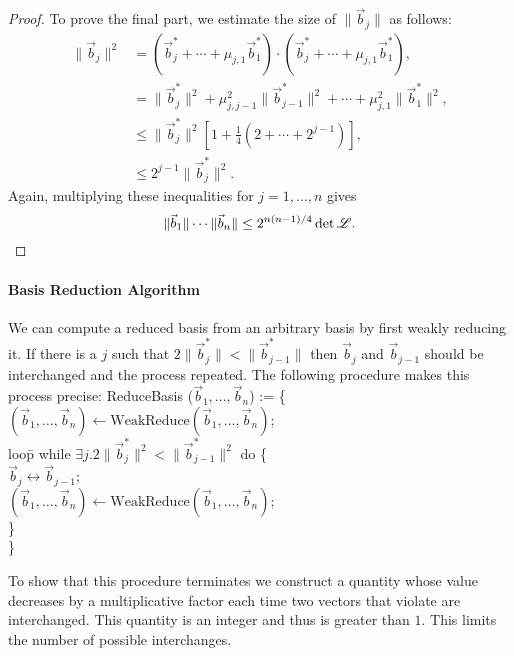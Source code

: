 \begin{proof}
To prove the final part, we estimate the size of $\|\vec{b}_j\|$ as follows:
\[
\begin{aligned}
 \|\vec{b}_j\|^2 
   & = (\vec{b}^{\ast}_j + \cdots + \mu_{j,1} \vec{b}^{\ast}_{1})
     \cdot
       (\vec{b}^{\ast}_j + \cdots + \mu_{j,1} \vec{b}^{\ast}_{1}), \\
   & = \|\vec{b}^{\ast}_j\|^2 + \mu_{j,j-1}^2 \|\vec{b}^{\ast}_{j-1}\|^2 +
       \cdots + \mu_{j,1}^2 \|\vec{b}^{\ast}_{1}\|^2, \\[3pt]
   & \displaystyle
     \le \|\vec{b}^{\ast}_j\|^2 \left[ 1 + \frac{1}{4}(2 + \cdots +
2^{j-1})\right], \\
 & \le 2^{j-1} \|\vec{b}^{\ast}_j\|^2.
\end{aligned}
\]
Again, multiplying these inequalities for $j = 1, \ldots, n$ gives
\[
\|\vec{b}_1\| \cdots \|\vec{b}_n\| \le 2^{n(n-1)/4} \det {\cal L}.
\]
\end{proof}

\paragraph{{\Lovasz} Basis Reduction Algorithm}

We can compute a reduced basis from an arbitrary basis by first weakly
reducing it.  If there is a $j$ such that $2 \|\vec{b}^{\ast}_j\| <
\|\vec{b}^{\ast}_{j-1}\|$ then $\vec{b}_j$ and $\vec{b}_{j-1}$ should
be interchanged and the process repeated.  The following procedure
makes this process precise:
\begindsacode
ReduceBasis ($\vec{b}_1, \ldots, \vec{b}_n$) := \{ \\
\> $(\vec{b}_1, \ldots, \vec{b}_n) \leftarrow
  \mbox{WeakReduce}(\vec{b}_1, \ldots, \vec{b}_n)$; \\
\> loo\=p while $\exists j . 2 \|\vec{b}^{\ast}_j\|^2 <
\|\vec{b}^{\ast}_{j-1}\|^2$ do \{ \\
\>\> $\vec{b}_j \leftrightarrow \vec{b}_{j-1}$; \\
\>\> $(\vec{b}_1, \ldots, \vec{b}_n) \leftarrow
  \mbox{WeakReduce}(\vec{b}_1, \ldots, \vec{b}_n)$; \\
\>\> \} \\
\> \} 
\enddsacode

To show that this procedure terminates we construct a quantity whose
value decreases by a multiplicative factor each time two vectors that
violate  are interchanged.  This quantity
is an integer and thus is greater than $1$.  This limits the number of
possible interchanges.

